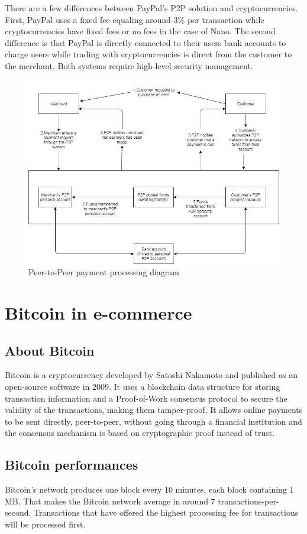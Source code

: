 \documentclass{ferseminar}
\begin{document}
There are a few differences between PayPal's P2P solution and cryptocurrencies. First, PayPal uses a fixed fee equaling around 3\% per transaction while cryptocurrencies have fixed fees or no fees in the case of Nano. The second difference is that PayPal is directly connected to their users bank accounts to charge users while trading with cryptocurrencies is direct from the customer to the merchant. Both systems require high-level security management. 
\begin{figure}
	\caption{Peer-to-Peer payment processing diagram}
	\includegraphics[scale=0.6]{diagram3}
	\centering
\end{figure}


\section{Bitcoin in e-commerce}

\subsection{About Bitcoin}
Bitcoin is a cryptocurrency developed by Satoshi Nakamoto and published as an open-source software in 2009. It uses a blockchain data structure for storing transaction information and a Proof-of-Work consensus protocol to secure the validity of the transactions, making them tamper-proof. It allows online payments to be sent directly, peer-to-peer, without going through a financial institution and the consensus mechanism is based on cryptographic proof instead of trust.

\subsection{Bitcoin performances}
Bitcoin's network produces one block every 10 minutes, each block containing 1 MB. That makes the Bitcoin network average in around 7 transactions-per-second. Transactions that have offered the highest processing fee for transactions will be processed first.
\end{document}
